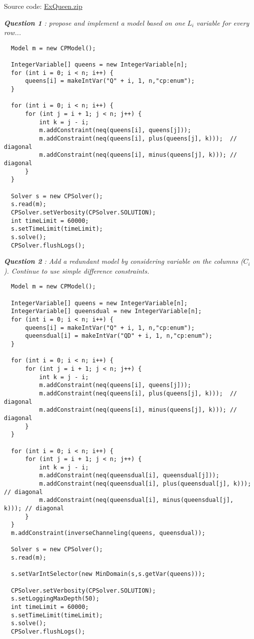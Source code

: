Source code: \href{media/zip/exqueen.zip}{ExQueen.zip}

\noindent\emph{\textbf{Question 1} : propose and implement a model based on one} $L_{i}$ \emph{variable for every row...}
\begin{lstlisting}
  Model m = new CPModel();
  
  IntegerVariable[] queens = new IntegerVariable[n];
  for (int i = 0; i < n; i++) {
      queens[i] = makeIntVar("Q" + i, 1, n,"cp:enum");
  }
	
  for (int i = 0; i < n; i++) {
      for (int j = i + 1; j < n; j++) {
          int k = j - i;
          m.addConstraint(neq(queens[i], queens[j]));
          m.addConstraint(neq(queens[i], plus(queens[j], k)));  // diagonal
          m.addConstraint(neq(queens[i], minus(queens[j], k))); // diagonal
      }
  }
	
  Solver s = new CPSolver();
  s.read(m);
  CPSolver.setVerbosity(CPSolver.SOLUTION);
  int timeLimit = 60000;
  s.setTimeLimit(timeLimit);
  s.solve();
  CPSolver.flushLogs();
\end{lstlisting}

\noindent\emph{\textbf{Question 2} : Add a redundant model by considering variable on the columns ($C_i$). Continue to use simple difference constraints.}

\begin{lstlisting}
  Model m = new CPModel();
	
  IntegerVariable[] queens = new IntegerVariable[n];
  IntegerVariable[] queensdual = new IntegerVariable[n];
  for (int i = 0; i < n; i++) {
      queens[i] = makeIntVar("Q" + i, 1, n,"cp:enum");
      queensdual[i] = makeIntVar("QD" + i, 1, n,"cp:enum");
  }
	
  for (int i = 0; i < n; i++) {
      for (int j = i + 1; j < n; j++) {
          int k = j - i;
          m.addConstraint(neq(queens[i], queens[j]));
          m.addConstraint(neq(queens[i], plus(queens[j], k)));  // diagonal
          m.addConstraint(neq(queens[i], minus(queens[j], k))); // diagonal
      }
  }

  for (int i = 0; i < n; i++) {
      for (int j = i + 1; j < n; j++) {
          int k = j - i;
          m.addConstraint(neq(queensdual[i], queensdual[j]));
          m.addConstraint(neq(queensdual[i], plus(queensdual[j], k)));  // diagonal
          m.addConstraint(neq(queensdual[i], minus(queensdual[j], k))); // diagonal
      }
  }
  m.addConstraint(inverseChanneling(queens, queensdual));
  
  Solver s = new CPSolver();
  s.read(m);
  
  s.setVarIntSelector(new MinDomain(s,s.getVar(queens)));
  
  CPSolver.setVerbosity(CPSolver.SOLUTION);
  s.setLoggingMaxDepth(50);
  int timeLimit = 60000;
  s.setTimeLimit(timeLimit);
  s.solve();
  CPSolver.flushLogs();
\end{lstlisting}

